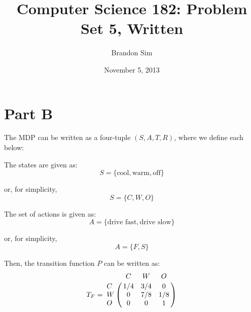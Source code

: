 \documentclass[12pt]{article}
\begin{document}
\date{November 5, 2013}
\title{Computer Science 182: Problem Set 5, Written}
\author{Brandon Sim}

\maketitle

\section{Part B}
The MDP can be written as a four-tuple $(S, A, T, R)$, where we define each below:

The states are given as:
\begin{equation*}
S = \{\textrm{cool}, \textrm{warm}, \textrm{off}\}
\end{equation*}

or, for simplicity,
\begin{equation*}
S = \{C, W, O\}
\end{equation*}

The set of actions is given as:
\begin{equation*}
A = \{\textrm{drive fast}, \textrm{drive slow}\}
\end{equation*}

or, for simplicity,
\begin{equation*}
A = \{F, S\}
\end{equation*}


Then, the transition function $P$ can be written as:
\begin{equation*}
T_{F} = 
\bordermatrix{&C&W&O\cr
                C & 1/4 & 3/4 & 0\cr
                W & 0 & 7/8 & 1/8\cr
                O & 0 & 0 & 1\cr}
\end{equation*}
\end{document}
